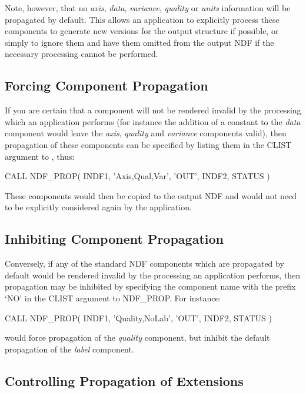 \documentclass[twoside,11pt,nolof]{starlink}
\providecommand{\st}[1]{{\emph{#1}}}
\begin{document}
Note, however, that no \st{axis}, \st{data}, \st{variance}, \st{quality\/}
or \st{units\/} information will be propagated by default.
This allows an application to explicitly process these components to
generate new versions for the output structure if possible, or simply to
ignore them and have them omitted from the output NDF if the necessary
processing cannot be performed.

\subsection{Forcing Component Propagation}

If you are certain that a component will not be rendered invalid by the
processing which an application performs (for instance the addition of a
constant to the \st{data\/} component would leave the \st{axis},
\st{quality\/} and \st{variance\/} components valid), then
propagation of these
components can be specified by listing them in the CLIST argument to
, thus:

\small
\begin{terminalv}
      CALL NDF_PROP( INDF1, 'Axis,Qual,Var', 'OUT', INDF2, STATUS )
\end{terminalv}
\normalsize

These components would then be copied to the output NDF and would not need
to be explicitly considered again by the application.

\subsection {Inhibiting Component Propagation}

Conversely, if any of the standard NDF components which are propagated by
default would be rendered invalid by the processing an application performs,
then propagation may be inhibited by specifying the component name with the
prefix `NO' in the CLIST argument to NDF\_PROP.
For instance:

\small
\begin{terminalv}
      CALL NDF_PROP( INDF1, 'Quality,NoLab', 'OUT', INDF2, STATUS )
\end{terminalv}
\normalsize

would force propagation of the \st{quality\/} component, but inhibit the
default propagation of the \st{label\/} component.

\subsection{\label{ss:propagatingextensions}Controlling Propagation of Extensions}
\end{document}
